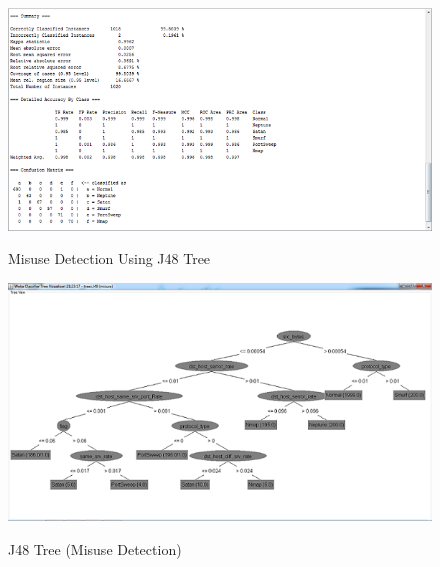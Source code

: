 \documentclass{article}
\begin{document}
 
\begin{figure}
   \begin{center}
     \includegraphics[scale=0.8]{Misuse_J48_cropped.png}
     \label{Misuse Detection Using J48 Tree}
     \caption{Misuse Detection Using J48 Tree}
   \end{center}
 \end{figure} 
 
 \begin{figure}
   \begin{center}
     \includegraphics{Misuse_J48_Tree.png}
     \label{J48 Tree (Misuse Detection)}
     \caption{J48 Tree (Misuse Detection)}
   \end{center}
 \end{figure}
 
\end{document}
